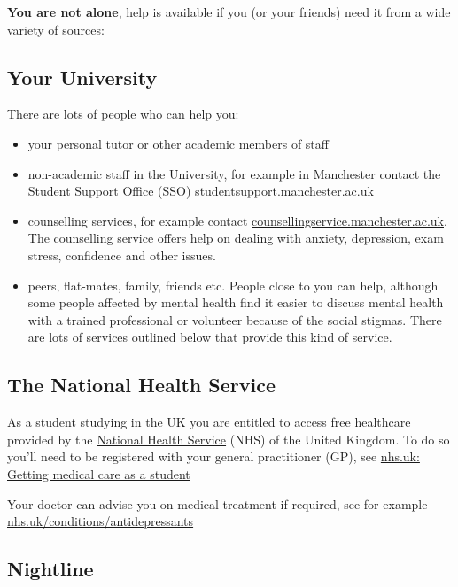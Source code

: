 \documentclass[
]{book}
\providecommand{\tightlist}{%
  \setlength{\itemsep}{0pt}\setlength{\parskip}{0pt}}
\begin{document}
\textbf{You are not alone}, help is available if you (or your friends) need it from a wide variety of sources:

\hypertarget{unihelp}{%
\subsection{Your University}\label{unihelp}}

There are lots of people who can help you:

\begin{itemize}
\tightlist
\item
  your personal tutor or other academic members of staff
\item
  non-academic staff in the University, for example in Manchester contact the Student Support Office (SSO) \href{https://www.studentsupport.manchester.ac.uk/}{studentsupport.manchester.ac.uk}
\item
  counselling services, for example contact \href{https://www.counsellingservice.manchester.ac.uk/}{counsellingservice.manchester.ac.uk}. The counselling service offers help on dealing with anxiety, depression, exam stress, confidence and other issues.
\item
  peers, flat-mates, family, friends etc. People close to you can help, although some people affected by mental health find it easier to discuss mental health with a trained professional or volunteer because of the social stigmas. There are lots of services outlined below that provide this kind of service.
\end{itemize}

\hypertarget{nhs}{%
\subsection{The National Health Service}\label{nhs}}

As a student studying in the UK you are entitled to access free healthcare provided by the \href{https://en.wikipedia.org/wiki/National_Health_Service}{National Health Service} (NHS) of the United Kingdom. To do so you'll need to be registered with your general practitioner (GP), see \href{https://www.nhs.uk/live-well/healthy-body/getting-medical-care-as-a-student/}{nhs.uk: Getting medical care as a student}

Your doctor can advise you on medical treatment if required, see for example \href{https://www.nhs.uk/conditions/antidepressants/}{nhs.uk/conditions/antidepressants}

\hypertarget{nightline}{%
\subsection{Nightline}\label{nightline}}
\end{document}
